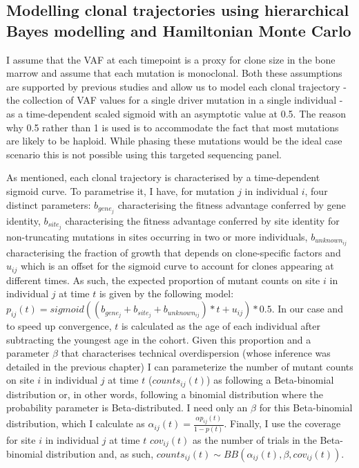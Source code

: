 \subsection{Modelling clonal trajectories using hierarchical Bayes modelling and Hamiltonian Monte Carlo}

I assume that the VAF at each timepoint is a proxy for clone size in the bone marrow and assume that each mutation is monoclonal. Both these assumptions are supported by previous studies \cite{Miles2020-fz,Lee2020-yp,Hwang2018-tp} and allow us to model each clonal trajectory - the collection of VAF values for a single driver mutation in a single individual - as a time-dependent scaled sigmoid with an asymptotic value at 0.5. The reason why 0.5 rather than 1 is used is to accommodate the fact that most mutations are likely to be haploid. While phasing these mutations would be the ideal case scenario this is not possible using this targeted sequencing panel.

As mentioned, each clonal trajectory is characterised by a time-dependent sigmoid curve. To parametrise it, I have, for mutation $j$ in individual $i$, four distinct parameters: $b_{gene_j}$ characterising the fitness advantage conferred by gene identity, $b_{site_j}$ characterising the fitness advantage conferred by site identity for non-truncating mutations in sites occurring in two or more individuals, $b_{unknown_{ij}}$ characterising the fraction of growth that depends on clone-specific factors and $u_{ij}$ which is an offset for the sigmoid curve to account for clones appearing at different times. As such, the expected proportion of mutant counts on site $i$ in individual $j$ at time $t$ is given by the following model: $p_{ij}(t)=sigmoid((b_{gene_j}+b_{site_j}+b_{unknown_{ij}})*t + u_{ij})*0.5$. In our case and to speed up convergence, $t$ is calculated as the age of each individual after subtracting the youngest age in the cohort. Given this proportion and a parameter $\beta$ that characterises technical overdispersion (whose inference was detailed in the previous chapter) I can parameterize the number of mutant counts on site $i$ in individual $j$ at time $t$ ($counts_{ij}(t)$) as following a Beta-binomial distribution or, in other words, following a binomial distribution where the probability parameter is Beta-distributed. I need only an $\beta$ for this Beta-binomial distribution, which I calculate as $\alpha_{ij}(t)=\frac{\alpha p_{ij}(t)}{1-p(t)}$. Finally, I use the coverage for site $i$ in individual $j$ at time $t$ $cov_{ij}(t)$ as the number of trials in the Beta-binomial distribution and, as such, $counts_{ij}(t) \sim BB(\alpha_{ij}(t),\beta,cov_{ij}(t))$.


